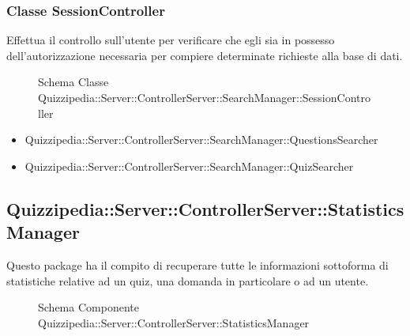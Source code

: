 \subsubsection{Classe SessionController}
Effettua il controllo sull'utente per verificare che egli sia in possesso dell'autorizzazione necessaria per compiere determinate richieste alla base di dati.
\begin{figure}[H]
\centering
\noindent{}
\caption{Schema Classe Quizzipedia::Server::ControllerServer::SearchManager::SessionController}
\end{figure}
\begin{itemize}
\item Quizzipedia::Server::ControllerServer::SearchManager::QuestionsSearcher
\item Quizzipedia::Server::ControllerServer::SearchManager::QuizSearcher
\end{itemize}
\subsection{Quizzipedia::Server::ControllerServer::StatisticsManager}
Questo package ha il compito di recuperare tutte le informazioni sottoforma di statistiche relative ad un quiz, una domanda in particolare o ad un utente.
\begin{figure}[H]
\centering
\noindent{}
\caption[Quizzipedia::Server::ControllerServer::StatisticsManager]{Schema Componente Quizzipedia::Server::ControllerServer::StatisticsManager}
\end{figure}
